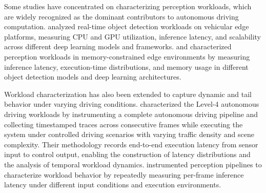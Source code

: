 Some studies have concentrated on characterizing perception workloads, which are widely recognized as the dominant contributors to autonomous driving computation.  analyzed real-time object detection workloads on vehicular edge platforms, measuring CPU and GPU utilization, inference latency, and scalability across different deep learning models and frameworks. %
 and  characterized perception workloads in memory-constrained edge environments by measuring inference latency, execution-time distributions, and memory usage in different object detection models and deep learning architectures.


Workload characterization has also been extended to capture dynamic and tail behavior under varying driving conditions.   characterized the Level-4 autonomous driving workloads by instrumenting a complete autonomous driving pipeline and collecting timestamped traces across consecutive frames while executing the system under controlled driving scenarios with varying traffic density and scene complexity. Their methodology records end-to-end execution latency from sensor input to control output, enabling the construction of latency distributions and the analysis of temporal workload dynamics.  instrumented perception pipelines to characterize workload behavior by repeatedly measuring per-frame inference latency under different input conditions and execution environments. %

